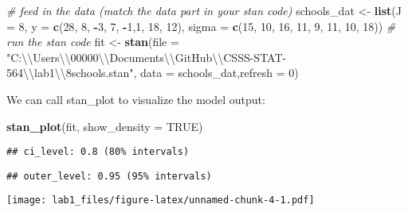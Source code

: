\documentclass[]{article}
\newenvironment{Shaded}{\begin{snugshade}}{\end{snugshade}}
\newcommand{\KeywordTok}[1]{\textcolor[rgb]{0.13,0.29,0.53}{\textbf{#1}}}
\newcommand{\DataTypeTok}[1]{\textcolor[rgb]{0.13,0.29,0.53}{#1}}
\newcommand{\DecValTok}[1]{\textcolor[rgb]{0.00,0.00,0.81}{#1}}
\newcommand{\CharTok}[1]{\textcolor[rgb]{0.31,0.60,0.02}{#1}}
\newcommand{\StringTok}[1]{\textcolor[rgb]{0.31,0.60,0.02}{#1}}
\newcommand{\CommentTok}[1]{\textcolor[rgb]{0.56,0.35,0.01}{\textit{#1}}}
\newcommand{\OtherTok}[1]{\textcolor[rgb]{0.56,0.35,0.01}{#1}}
\newcommand{\OperatorTok}[1]{\textcolor[rgb]{0.81,0.36,0.00}{\textbf{#1}}}
\newcommand{\NormalTok}[1]{#1}
\begin{document}
\begin{Shaded}
\begin{Highlighting}[]
\CommentTok{# feed in the data (match the data part in your stan code)}
\NormalTok{schools_dat <-}\StringTok{ }\KeywordTok{list}\NormalTok{(}\DataTypeTok{J =} \DecValTok{8}\NormalTok{, }
                    \DataTypeTok{y =} \KeywordTok{c}\NormalTok{(}\DecValTok{28}\NormalTok{, }\DecValTok{8}\NormalTok{, }\OperatorTok{-}\DecValTok{3}\NormalTok{,  }\DecValTok{7}\NormalTok{, }\OperatorTok{-}\DecValTok{1}\NormalTok{,}\DecValTok{1}\NormalTok{, }\DecValTok{18}\NormalTok{, }\DecValTok{12}\NormalTok{),}
                    \DataTypeTok{sigma =} \KeywordTok{c}\NormalTok{(}\DecValTok{15}\NormalTok{, }\DecValTok{10}\NormalTok{, }\DecValTok{16}\NormalTok{, }\DecValTok{11}\NormalTok{, }\DecValTok{9}\NormalTok{, }\DecValTok{11}\NormalTok{, }\DecValTok{10}\NormalTok{, }\DecValTok{18}\NormalTok{))}
\CommentTok{# run the stan code }
\NormalTok{fit <-}\StringTok{ }\KeywordTok{stan}\NormalTok{(}\DataTypeTok{file =} \StringTok{"C:}\CharTok{\textbackslash{}\textbackslash{}}\StringTok{Users}\CharTok{\textbackslash{}\textbackslash{}}\StringTok{00000}\CharTok{\textbackslash{}\textbackslash{}}\StringTok{Documents}\CharTok{\textbackslash{}\textbackslash{}}\StringTok{GitHub}\CharTok{\textbackslash{}\textbackslash{}}\StringTok{CSSS-STAT-564}\CharTok{\textbackslash{}\textbackslash{}}\StringTok{lab1}\CharTok{\textbackslash{}\textbackslash{}}\StringTok{8schools.stan"}\NormalTok{, }\DataTypeTok{data =}\NormalTok{ schools_dat,}\DataTypeTok{refresh =} \DecValTok{0}\NormalTok{)}
\end{Highlighting}
\end{Shaded}

We can call stan\_plot to visualize the model output:

\begin{Shaded}
\begin{Highlighting}[]
\KeywordTok{stan_plot}\NormalTok{(fit, }\DataTypeTok{show_density =} \OtherTok{TRUE}\NormalTok{)}
\end{Highlighting}
\end{Shaded}

\begin{verbatim}
## ci_level: 0.8 (80% intervals)
\end{verbatim}

\begin{verbatim}
## outer_level: 0.95 (95% intervals)
\end{verbatim}

\texttt{[image: lab1\_files/figure-latex/unnamed-chunk-4-1.pdf]}
\end{document}
